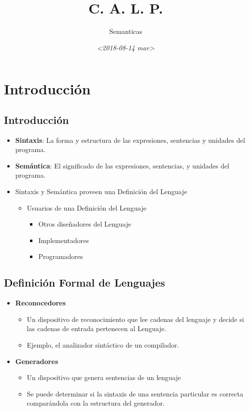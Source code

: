 \documentclass[11pt]{article}
\author{Semanticas}
\date{\textit{<2018-08-14 mar>}}
\title{C. A. L. P.}
\begin{document}
\maketitle



\section*{Introducción}
\label{sec:orgeab22ee}

\subsection*{Introducción}
\label{sec:orgd827289}
\begin{itemize}
\item \textbf{Sintaxis}: La forma y estructura de las expresiones, sentencias y
unidades del programa.
\item \textbf{Semántica}: El significado de las expresiones, sentencias, y
unidades del programa.
\item Sintaxis y Semántica proveen una Definición del Lenguaje
\begin{itemize}
\item Usuarios de una Definición del Lenguaje
\begin{itemize}
\item Otros diseñadores del Lenguaje
\item Implementadores
\item Programadores
\end{itemize}
\end{itemize}
\end{itemize}

\subsection*{Definición Formal de Lenguajes}
\label{sec:orge40f493}
\begin{itemize}
\item \textbf{Reconocedores}
\begin{itemize}
\item Un dispositivo de reconocimiento que lee cadenas del lenguaje y
decide si las cadenas de entrada pertenecen al Lenguaje.
\item Ejemplo, el analizador sintáctico de un compilador.
\end{itemize}
\item \textbf{Generadores}
\begin{itemize}
\item Un dispositivo que genera sentencias de un lenguaje
\item Se puede determinar si la sintaxis de una sentencia particular es
correcta comparándola con la estructura del generador.
\end{itemize}
\end{itemize}
\end{document}
